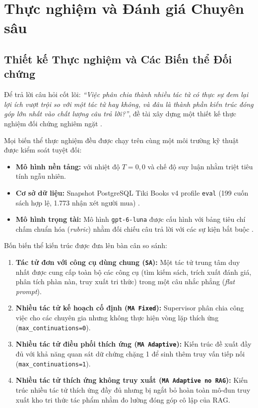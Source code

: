 \section{Thực nghiệm và Đánh giá Chuyên sâu}

\subsection{Thiết kế Thực nghiệm và Các Biến thể Đối chứng}
Để trả lời câu hỏi cốt lõi: \textit{``Việc phân chia thành nhiều tác tử có thực sự đem lại lợi ích vượt trội so với một tác tử hay không, và đâu là thành phần kiến trúc đóng góp lớn nhất vào chất lượng câu trả lời?''}, đề tài xây dựng một thiết kế thực nghiệm đối chứng nghiêm ngặt .

Mọi biến thể thực nghiệm đều được chạy trên cùng một môi trường kỹ thuật được kiểm soát tuyệt đối:
\begin{itemize}
    \item \textbf{Mô hình nền tảng:}  với nhiệt độ $T = 0{,}0$ và chế độ suy luận  nhằm triệt tiêu tính ngẫu nhiên.
    \item \textbf{Cơ sở dữ liệu:} Snapshot PostgreSQL Tiki Books v4 profile \texttt{eval} (199 cuốn sách hợp lệ, 1.773 nhận xét người mua) .
    \item \textbf{Mô hình trọng tài:} Mô hình \texttt{gpt-6-luna} được cấu hình với bảng tiêu chí chấm chuẩn hóa (\textit{rubric}) nhằm đối chiếu câu trả lời với các sự kiện bắt buộc .
\end{itemize}

Bốn biến thể kiến trúc được đưa lên bàn cân so sánh:
\begin{enumerate}
    \item \textbf{Tác tử đơn với công cụ dùng chung (\texttt{SA}):} Một tác tử trung tâm duy nhất được cung cấp toàn bộ các công cụ (tìm kiếm sách, trích xuất đánh giá, phân tích phàn nàn, truy xuất tri thức) trong một câu nhắc phẳng (\textit{flat prompt}).
    \item \textbf{Nhiều tác tử kế hoạch cố định (\texttt{MA Fixed}):} Supervisor phân chia công việc cho các chuyên gia nhưng không thực hiện vòng lặp thích ứng (\texttt{max\_continuations=0}).
    \item \textbf{Nhiều tác tử điều phối thích ứng (\texttt{MA Adaptive}):} Kiến trúc đề xuất đầy đủ với khả năng quan sát dữ chứng chặng 1 để sinh thêm truy vấn tiếp nối (\texttt{max\_continuations=1}).
    \item \textbf{Nhiều tác tử thích ứng không truy xuất (\texttt{MA Adaptive no RAG}):} Kiến trúc nhiều tác tử thích ứng đầy đủ nhưng bị ngắt bỏ hoàn toàn mô-đun truy xuất kho tri thức tác phẩm nhằm đo lường đóng góp cô lập của RAG.
\end{enumerate}

